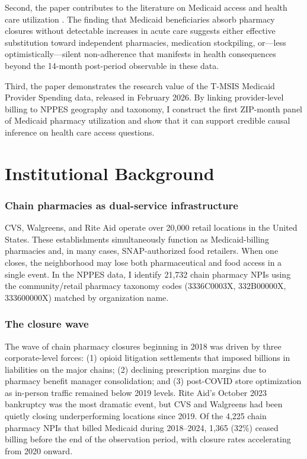 \documentclass[12pt]{article}
\begin{document}
Second, the paper contributes to the literature on Medicaid access and health care utilization \citep{finkelstein2012oregon, baicker2014effect, currie2010health}. The finding that Medicaid beneficiaries absorb pharmacy closures without detectable increases in acute care suggests either effective substitution toward independent pharmacies, medication stockpiling, or---less optimistically---silent non-adherence that manifests in health consequences beyond the 14-month post-period observable in these data.

Third, the paper demonstrates the research value of the T-MSIS Medicaid Provider Spending data, released in February 2026. By linking provider-level billing to NPPES geography and taxonomy, I construct the first ZIP-month panel of Medicaid pharmacy utilization and show that it can support credible causal inference on health care access questions.

\section{Institutional Background}

\subsubsection*{Chain pharmacies as dual-service infrastructure} CVS, Walgreens, and Rite Aid operate over 20,000 retail locations in the United States. These establishments simultaneously function as Medicaid-billing pharmacies and, in many cases, SNAP-authorized food retailers. When one closes, the neighborhood may lose both pharmaceutical and food access in a single event. In the NPPES data, I identify 21,732 chain pharmacy NPIs using the community/retail pharmacy taxonomy codes (3336C0003X, 332B00000X, 333600000X) matched by organization name.

\subsubsection*{The closure wave} The wave of chain pharmacy closures beginning in 2018 was driven by three corporate-level forces: (1) opioid litigation settlements that imposed billions in liabilities on the major chains; (2) declining prescription margins due to pharmacy benefit manager consolidation; and (3) post-COVID store optimization as in-person traffic remained below 2019 levels. Rite Aid's October 2023 bankruptcy was the most dramatic event, but CVS and Walgreens had been quietly closing underperforming locations since 2019. Of the 4,225 chain pharmacy NPIs that billed Medicaid during 2018--2024, 1,365 (32\%) ceased billing before the end of the observation period, with closure rates accelerating from 2020 onward.
\end{document}
